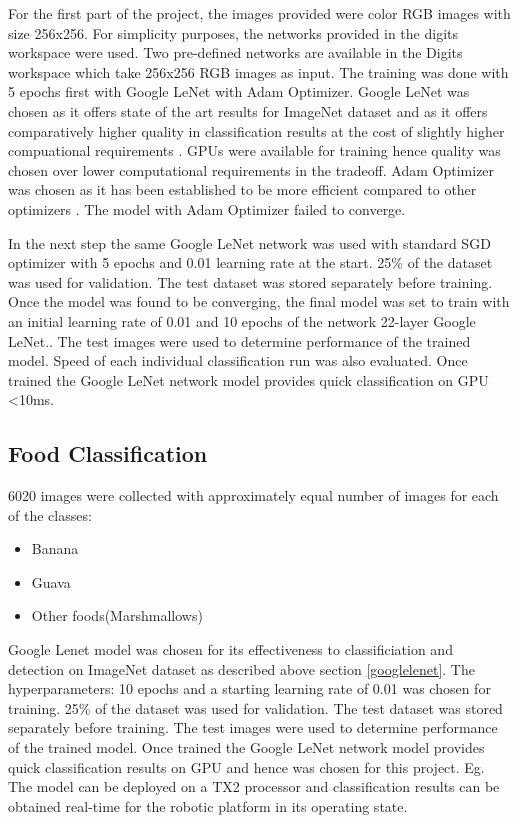 \documentclass[10pt,journal,compsoc]{IEEEtran}
\begin{document}
For the first part of the project, the images provided were color RGB images with size 256x256. For simplicity purposes, the networks provided in the digits workspace were used. Two pre-defined networks are available in the Digits workspace which take 256x256 RGB images as input. The training was done with 5 epochs first with Google LeNet with Adam Optimizer. Google LeNet was chosen as it offers state of the art results for ImageNet dataset and as it offers comparatively higher quality in classification results\cite{DBLP} at the cost of slightly higher compuational requirements \label{googlelenet}. GPUs were available for training hence quality was chosen over lower computational requirements in the tradeoff.  Adam Optimizer was chosen as it has been established to be more efficient compared to other optimizers \cite{adam}. The model with Adam Optimizer failed to converge. 

In the next step the same Google LeNet network was used with standard SGD optimizer with 5 epochs and 0.01 learning rate at the start. 25\% of the dataset was used for validation. The test dataset was stored separately before training.
Once the model was found to be converging, the final model was set to train with an initial learning rate of 0.01 and 10 epochs of the network 22-layer Google LeNet.\cite{DBLP}. The test images were used to determine performance of the trained model. Speed of each individual classification run was also evaluated. Once trained the Google LeNet network model provides quick classification on GPU <10ms. 

\subsection{Food Classification}
6020 images were collected with approximately equal number of images for each of the classes:
\begin{itemize}
\item Banana
\item Guava
\item Other foods(Marshmallows)
\end {itemize}
Google Lenet\cite{DBLP} model was chosen for its effectiveness to classificiation and detection on ImageNet dataset as described above section \ref{googlelenet}. The hyperparameters: 10 epochs and a starting learning rate of 0.01 was chosen for training. 25\% of the dataset was used for validation. The test dataset was stored separately before training. The test images were used to determine performance of the trained model. Once trained the Google LeNet network model provides quick classification results on GPU and hence was chosen for this project. Eg. The model can be deployed on a TX2 processor and classification  results can be obtained real-time for the robotic platform in its operating state.
\end{document}
